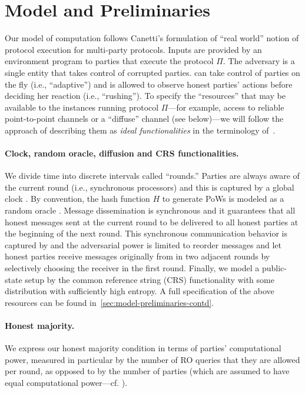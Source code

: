 \section{Model and Preliminaries}
\label{sec:model}

Our model of computation follows Canetti's formulation of ``real world'' notion of protocol execution \cite{JC:Canetti00,EPRINT:Canetti00} for multi-party protocols.
%
Inputs are provided by an environment program \Z to parties that execute the protocol $\Pi$.
%
The adversary \adv is a single entity that takes control of corrupted parties.
%
\adv can take control of parties on the fly (i.e., ``adaptive'') and is allowed to observe honest parties' actions before deciding her reaction (i.e., ``rushing'').
%
To  specify the ``resources'' that may be available to the instances running protocol $\Pi$---for example, access to reliable point-to-point channels or a ``diffuse'' channel (see below)---we will follow the approach of describing them as \emph{ideal functionalities} in the terminology of~\cite{EPRINT:Canetti00}.

\paragraph{Clock, random oracle, diffusion and CRS functionalities.}
%
We divide time into discrete intervals called ``rounds.''
%
Parties are always aware of the current round (i.e., synchronous processors) and this is captured by a global clock \funcClock \cite{TCC:KMTZ13}.
%
By convention, the hash function $H$ to generate PoWs is modeled as a random oracle \funcRO.
%
Message dissemination is synchronous and it guarantees that all honest messages sent at the current round to be delivered to all honest parties at the beginning of the next round.
%
This synchronous communication behavior is captured by \funcDiffuse and the adversarial power is limited to reorder messages and let honest parties receive messages originally from \adv in two adjacent rounds by selectively choosing the receiver in the first round.
%
Finally, we model a public-state setup by the common reference string (CRS) functionality \funcCRS with some distribution with sufficiently high entropy.
%
A full specification of the above resources can be found in~\cref{sec:model-preliminaries-contd}.

\paragraph{Honest majority.}
%
We express our honest majority condition in terms of parties' computational power, measured in particular by the number of RO queries that they are allowed per round, as opposed to by the number of parties (which are assumed to have  equal computational power---cf. \cite{EC:GarKiaLeo15}).

